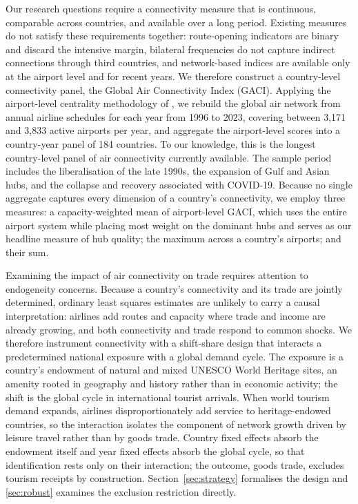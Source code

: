 Our research questions require a connectivity measure that is continuous, comparable across countries, and available over a long period. Existing measures do not satisfy these requirements together: route-opening
indicators are binary and discard the intensive margin, bilateral frequencies do not capture indirect connections through third countries, and network-based indices are available only at the airport level and for
recent years. We therefore construct a country-level connectivity panel, the Global Air Connectivity Index (GACI). Applying the airport-level centrality methodology of \citet{Cheung_2020}, we rebuild the global air
network from annual airline schedules for each year from 1996 to 2023, covering between 3{,}171 and 3{,}833 active airports per year, and aggregate the airport-level scores into a country-year panel of 184
countries. To our knowledge, this is the longest country-level panel of air connectivity currently available. The sample period includes the liberalisation of the late 1990s, the expansion of Gulf and Asian hubs,
and the collapse and recovery associated with COVID-19. Because no single aggregate captures every dimension of a country's connectivity, we employ three measures: a capacity-weighted mean of airport-level GACI, which uses the entire airport system while placing most weight on the dominant hubs and serves as our headline measure of hub quality; the maximum across a country's airports; and their sum.

Examining the impact of air connectivity on trade requires attention to endogeneity concerns. Because a country's connectivity and its trade are jointly determined, ordinary least squares estimates are unlikely to carry a causal interpretation: airlines add routes and capacity where trade and income are already growing, and both connectivity and trade respond to common shocks. We therefore instrument connectivity with a shift-share design that interacts a predetermined national exposure with a global demand cycle. The exposure is a country's endowment of natural and mixed UNESCO World Heritage sites, an amenity rooted in geography and history rather than in economic activity; the shift is the global cycle in international tourist arrivals. When world tourism demand expands, airlines disproportionately add service to heritage-endowed countries, so the interaction isolates the component of network growth driven by leisure travel rather than by goods trade. Country fixed effects absorb the endowment itself and year fixed effects absorb the global cycle, so that identification rests only on their interaction; the outcome, goods trade, excludes tourism receipts by construction. Section~\ref{sec:strategy} formalises the design and \ref{sec:robust} examines the exclusion restriction directly.

